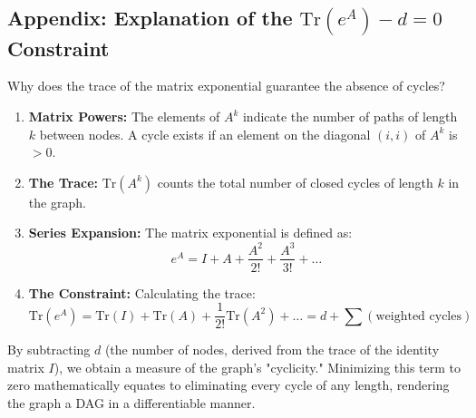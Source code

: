 \subsection{Appendix: Explanation of the $\text{Tr}(e^A) - d = 0$ Constraint}

Why does the trace of the matrix exponential guarantee the absence of cycles?

\begin{enumerate}
    \item \textbf{Matrix Powers:} The elements of $A^k$ indicate the number of paths of length $k$ between nodes. A cycle exists if an element on the diagonal $(i, i)$ of $A^k$ is $>0$.
    \item \textbf{The Trace:} $\text{Tr}(A^k)$ counts the total number of closed cycles of length $k$ in the graph.
    \item \textbf{Series Expansion:} The matrix exponential is defined as:
    \begin{equation}
    e^A = I + A + \frac{A^2}{2!} + \frac{A^3}{3!} + \dots
    \end{equation}
    \item \textbf{The Constraint:} Calculating the trace:
    \begin{equation}
    \text{Tr}(e^A) = \text{Tr}(I) + \text{Tr}(A) + \frac{1}{2!}\text{Tr}(A^2) + \dots = d + \sum (\text{weighted cycles})
    \end{equation}
\end{enumerate}

By subtracting $d$ (the number of nodes, derived from the trace of the identity matrix $I$), we obtain a measure of the graph's "cyclicity." Minimizing this term to zero mathematically equates to eliminating every cycle of any length, rendering the graph a DAG in a differentiable manner.